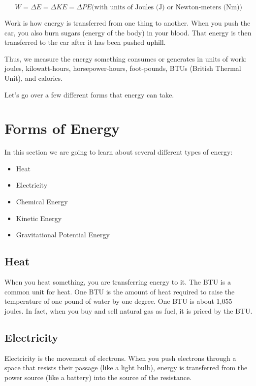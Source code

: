 \[
W = \Delta E = \Delta KE = \Delta PE \text{(with units of Joules (J) or Newton-meters (Nm))} 
\]


Work is how energy is transferred from one thing to another. When you
push the car, you also burn sugars (energy of the body) in your blood. That energy is then
transferred to the car after it has been pushed uphill.

Thus, we measure the energy something consumes or generates in
units of work: joules, kilowatt-hours, horsepower-hours, foot-pounds,
BTUs (British Thermal Unit), and calories.

Let's go over a few different forms that energy can take.

\section{Forms of Energy}

In this section we are going to learn about several different types of energy:
\begin{itemize}
\item Heat
\item Electricity
\item Chemical Energy
\item Kinetic Energy
\item Gravitational Potential Energy
\end{itemize}

\subsection{Heat}

When you heat something, you are transferring energy to it. The BTU
 is a common unit for heat. One BTU is the
amount of heat required to raise the temperature of one pound of water
by one degree. One BTU is about 1,055 joules. In fact, when you buy and sell
natural gas as fuel, it is priced by the BTU. 

\subsection{Electricity}

Electricity is the movement of electrons. When you push electrons
through a space that resists their passage (like a light bulb),
energy is transferred from the power source (like a battery)
 into the source of the resistance.

